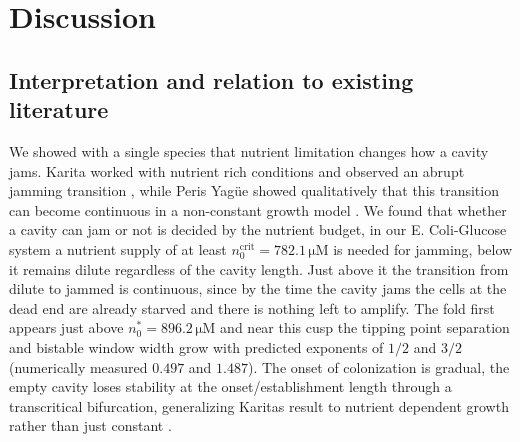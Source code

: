 \documentclass[11pt,a4paper]{report}
\begin{document}
	\chapter{Discussion}
	\section{Interpretation and relation to existing literature}
	We showed with a single species that nutrient limitation changes how a cavity jams. Karita worked with nutrient rich conditions and observed an abrupt jamming transition \cite{Karita}, while Peris Yagüe showed qualitatively that this transition can become continuous in a non-constant growth model \cite{peris}. We found that whether a cavity can jam or not is decided by the nutrient budget, in our E. Coli-Glucose system a nutrient supply of at least $n_0^{\mathrm{crit}}=782.1\,\mathrm{\mu M}$ is needed for jamming, below it remains dilute regardless of the cavity length. Just above it the transition from dilute to jammed is continuous, since by the time the cavity jams the cells at the dead end are already starved and there is nothing left to amplify. The fold first appears just above $n_0^{*}=896.2\,\mathrm{\mu M}$ and near this cusp the tipping point separation and bistable window width grow with predicted exponents of $1/2$ and $3/2$ (numerically measured $0.497$ and $1.487$). The onset of colonization is gradual, the empty cavity loses stability at the onset/establishment length through a transcritical bifurcation, generalizing Karitas result to nutrient dependent growth rather than just constant \cite{Karita, bifurcation}. \\
	\\
\end{document}
